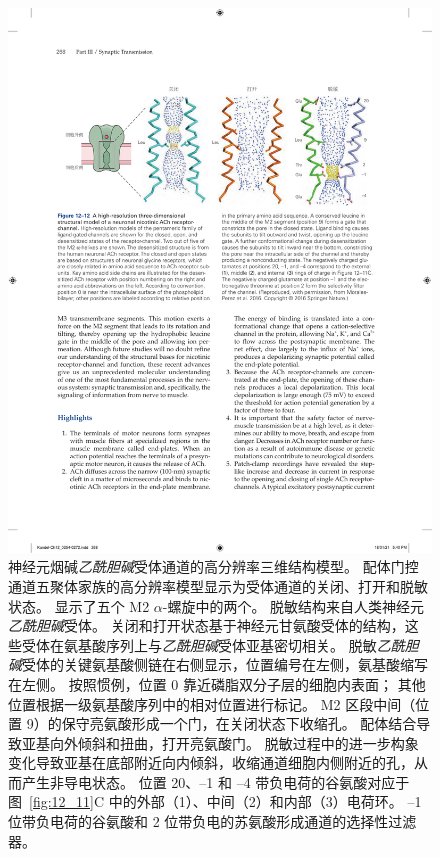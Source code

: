 \begin{figure}[htbp]
	\centering
	\includegraphics[width=1.0\linewidth]{chap12/fig_12_12}
	\caption{神经元烟碱\textit{乙酰胆碱}受体通道的高分辨率三维结构模型。
		配体门控通道五聚体家族的高分辨率模型显示为受体通道的关闭、打开和脱敏状态。
		显示了五个 M2 $\alpha$-螺旋中的两个。
		脱敏结构来自人类神经元\textit{乙酰胆碱}受体。
		关闭和打开状态基于神经元甘氨酸受体的结构，这些受体在氨基酸序列上与\textit{乙酰胆碱}受体亚基密切相关。
		脱敏\textit{乙酰胆碱}受体的关键氨基酸侧链在右侧显示，位置编号在左侧，氨基酸缩写在左侧。
		按照惯例，位置 0 靠近磷脂双分子层的细胞内表面；
		其他位置根据一级氨基酸序列中的相对位置进行标记。
		M2 区段中间（位置 9）的保守亮氨酸形成一个门，在关闭状态下收缩孔。
		配体结合导致亚基向外倾斜和扭曲，打开亮氨酸门。
		脱敏过程中的进一步构象变化导致亚基在底部附近向内倾斜，收缩通道细胞内侧附近的孔，从而产生非导电状态。
		位置 20、–1 和 –4 带负电荷的谷氨酸对应于图~\ref{fig:12_11}C 中的外部（1）、中间（2）和内部（3）电荷环。
		–1 位带负电荷的谷氨酸和 2 位带负电的苏氨酸形成通道的选择性过滤器\cite{morales2016x}。}
	\label{fig:12_12}
\end{figure}



